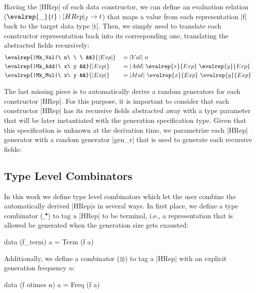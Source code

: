 Having the |HRep| of each data constructor, we can define an evaluation relation
($\evalrep{\_}{t} : |HRep|_f \rightarrow t$) that maps a value from each
representation |f| back to the target data type |t|.
%
Then, we simply need to translate each constructor representation back into its
corresponding one, translating the abstracted fields recursively:
%
\begin{alignat*}{4}
  &\evalrep{|Mk_Val|\ n\ \ \ &&}{|Exp|}
    &&= |Val|\ n \\
  &\evalrep{|Mk_Add|\ x\ y   &&}{|Exp|}
    &&= |Add|\ \evalrep{x}{Exp}\ \evalrep{y}{Exp} \\
  &\evalrep{|Mk_Mul|\ x\ y   &&}{|Exp|}
    &&= |Mul|\ \evalrep{x}{Exp}\ \evalrep{y}{Exp}
\end{alignat*}

The last missing piece is to automatically derive a random generators for each
constructor |HRep|.
%
For this purpose, it is important to consider that each constructor |HRep| has
its recursive fields abstracted away with a type parameter that will be later
instantiated with the generation specification type.
%
Given that this specification is unknown at the derivation time, we parametrize
each |HRep| generator with a random generator |gen_r| that is used to generate
each recursive fields:



\subsection*{\textbf{Type Level Combinators}}

In this work we define type level combinators which let the user combine the
automatically derived |HRep|s in several ways.
%
In first place, we define a type combinator ($\_^\bullet$) to tag a |HRep| to be
terminal, i.e., a representation that is allowed be generated when the
generation size gets exausted:
%
\begin{code}
data (f_term) a = Term (f a)
\end{code}

Additionally, we define a combinator ($\otimes$) to tag a |HRep| with an
explicit generation frequency $n$:

\begin{code}
data (f otimes n) a = Freq (f a)
\end{code}


